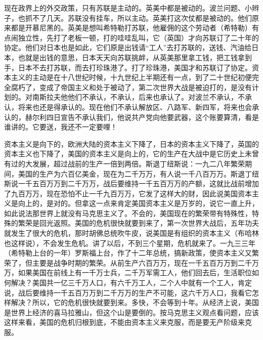 现在政界上的外交政策，只有苏联是主动的。英美中都是被动的。波兰问题、小辫子，也抓不了几天。苏联没有挂车，所以主动。英美打这次仗都是被动的。他们原来都是开慕尼黑的。英美是想叫希特勒打苏联，他雇佣的这个劳动者（希特勒）有点闹独立性，先打了老板一顿，打的哇哇乱叫，它（英国）才向苏联订了二十年的协定。他们对日本也是如此，它们原是出钱请“工人”去打苏联的，送钱、汽油给日本，也就是出钱的意思，日本天天向苏联挑衅，从英美那里拿工钱，把工钱拿到手，日本不去打苏联，而去打珍珠港了。打了珍珠港，美国才和苏联订了协定。资本主义的主动是在十八世纪时候，十九世纪上半期还有一点，到了二十世纪初便完全腐朽了，变成了帝国主义和处于被动了，第二次世界大战是被迫打的，是没有计划的。对南斯拉夫他他们不承认，不承认，后来也承认了。对波兰不承认，不承认，将来也还是得承认的。现在他们不承认解放区、八路军、新四军，将来也会承认的，赫尔利四日宣告不承认我们，他说共产党向他要武器，这个账要算清，看是谁讲的。它要送，我还不一定要哩！

资本主义是向下的，欧洲大陆的资本主义下降了，日本的资本主义下降了，英国的资本主义也下降了，美国的资本主义是向上的，它的生产在大战中是它历史上未曾有过的大发展，超过战前的生产一倍到两倍。斯退丁纽斯说：一九二八年繁荣期间，美国的生产为六百亿美金，现在为二千万万，有人说一千八百万万。斯退丁纽斯说一千五百万万到二千万万，战后要维持一千五百万万的产额，这就比战前增加了九百万万，现在恐怕不止一千九百万万，它发了这样大的财，因此说美国资本主义是向上的，是对的。但拿这一点来肯定美国资本主义是万岁的，说它一直上升，如此说法那世界上就没有马克思主义了。不会的，美国现在的繁荣带有特殊性，特殊的繁荣是回光返照。美国的危机很快就要到来了，第一次世界大战后，五年功夫就发生了很大的危机，那时胡佛总统吹牛皮，说美国是有组织的资本主义（布哈林也这样说），不会发生危机。讲了以后，不到三个星期，危机就来了。一九三三年（希特勒上台的一年）罗斯福上台，作了十二年总统，搞新政策，使资本主义又繁荣了，但主要是战争时期的繁荣。从前生产六百万万，现在一千五百万万到二千万万，如果美国在前线上有一千万士兵，二千万军需工人，他们回去后，生活职位如何解决？美国共一亿三千万人口，有六千万工人，二个人中就有一个工人，肯定说，战后要维持一千五百万万到二千万万的生产不可能，这六千万人口，我看它怎样解决？所以，它的危机很快就要到来。多快，不会等到十年。从经济上说，美国是世界上经济的喜马拉雅山，但这个山是要倒的。按马克思主义观点看问题，应该这样来看，美国的危机归根到底，不能由资本主义来克服，而是要无产阶级来克服。

